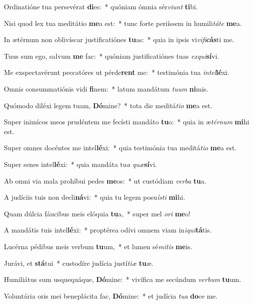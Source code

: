 \item Ordinatióne tua persevérat \textbf{di}es:~* quóniam ómnia sér\textit{vi}\textit{unt} \textbf{ti}bi.
\item Nisi quod lex tua meditátio \textbf{me}a est:~* tunc forte periíssem in humili\textit{tá}\textit{te} \textbf{me}a.
\item In ætérnum non oblivíscar justificatiónes \textbf{tu}as:~* quia in ipsis vi\textit{vi}\textit{fi}\textbf{cás}ti me.
\item Tuus sum ego, salvum \textbf{me} fac:~* quóniam justificatiónes tuas \textit{ex}\textit{qui}\textbf{sí}vi.
\item Me exspectavérunt peccatóres ut pérde\textbf{rent} me:~* testimónia tua \textit{in}\textit{tel}\textbf{lé}xi.
\item Omnis consummatiónis vidi \textbf{fi}nem:~* latum mandátum \textit{tu}\textit{um} \textbf{ni}mis.
\item Quómodo diléxi legem tuam, \textbf{Dó}mine?~* tota die meditá\textit{ti}\textit{o} \textbf{me}a est.
\item Super inimícos meos prudéntem me fecísti mandáto \textbf{tu}o:~* quia in æ\textit{tér}\textit{num} \textbf{mi}hi est.
\item Super omnes docéntes me intel\textbf{lé}xi:~* quia testimónia tua meditá\textit{ti}\textit{o} \textbf{me}a est.
\item Super senes intel\textbf{lé}xi:~* quia mandáta tu\textit{a} \textit{quæ}\textbf{sí}vi.
\item Ab omni via mala prohíbui pedes \textbf{me}os:~* ut custódiam \textit{ver}\textit{ba} \textbf{tu}a.
\item A judíciis tuis non decli\textbf{ná}vi:~* quia tu legem posu\textit{ís}\textit{ti} \textbf{mi}hi.
\item Quam dúlcia fáucibus meis elóquia \textbf{tu}a,~* super mel \textit{o}\textit{ri} \textbf{me}o!
\item A mandátis tuis intel\textbf{lé}xi:~* proptérea odívi omnem viam in\textit{i}\textit{qui}\textbf{tá}tis.
\item Lucérna pédibus meis verbum \textbf{tu}um,~* et lumen sé\textit{mi}\textit{tis} \textbf{me}is.
\item Jurávi, et \textbf{stá}tui~* custodíre judícia justí\textit{ti}\textit{æ} \textbf{tu}æ.
\item Humiliátus sum usquequáque, \textbf{Dó}mine:~* vivífica me secúndum \textit{ver}\textit{bum} \textbf{tu}um.
\item Voluntária oris mei beneplácita fac, \textbf{Dó}mine:~* et judícia \textit{tu}\textit{a} \textbf{do}ce me.
